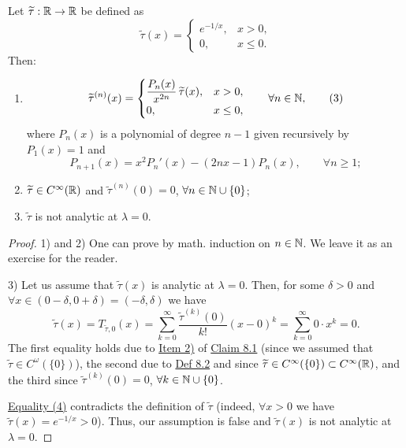 \begin{claim}\label{claim:8.2}
Let $\widetilde\tau:\mathbb{R}\to\mathbb{R}$ be defined as
\[
\widetilde\tau(x)=
\begin{cases}
e^{-1/x},&x>0,\\
0,&x\leq0.
\end{cases}
\]
Then:
\begin{enumerate}
    \item\label{item:claim:8.2:1}
    \[
    \widetilde\tau^{(n)}(x)=
    \begin{cases}
    \dfrac{P_n(x)}{x^{2n}}\,\widetilde\tau(x),&x>0,\\
    0,&x\leq0,
    \end{cases}
    \qquad \forall n\in\mathbb{N},
    \tag{3}\label{eq:8:3:1}
    \]
    where $P_n(x)$ is a polynomial of degree $n-1$ given recursively by $P_1(x)=1$ and
    \[
    P_{n+1}(x)=x^2P_n'(x)-(2nx-1)P_n(x),\qquad \forall n\geq1;
    \]
    \item\label{item:claim:8.2:2} $\widetilde\tau\in C^\infty(\mathbb{R})$ and $\widetilde\tau^{(n)}(0)=0$, $\forall n\in\mathbb{N}\cup\{0\}$;
    \item\label{item:claim:8.2:3} $\widetilde\tau$ is not analytic at $\lambda=0$.
\end{enumerate}
\end{claim}

\begin{proof}
1) and 2) One can prove by math. induction on $n\in\mathbb{N}$.
We leave it as an exercise for the reader.

3) Let us assume that $\widetilde\tau(x)$ is analytic at $\lambda=0$.
Then, for some $\delta>0$ and $\forall x\in(0-\delta,0+\delta)=(-\delta,\delta)$ we have
\[
\widetilde\tau(x)
=T_{\widetilde\tau,0}(x)
=\sum_{k=0}^{\infty}\frac{\widetilde\tau^{(k)}(0)}{k!}(x-0)^k
=\sum_{k=0}^{\infty}0\cdot x^k
=0.
\tag{4}\label{eq:8:4:1}
\]
The first equality holds due to \hyperref[item:claim:8.1:2]{Item 2)} of \hyperref[claim:8.1]{Claim 8.1} (since we assumed that $\widetilde\tau\in C^\omega(\{0\})$), the second due to \hyperref[def:8.2]{Def 8.2} and since $\widetilde\tau\in C^\infty(\{0\})\subset C^\infty(\mathbb{R})$, and the third since $\widetilde\tau^{(k)}(0)=0$, $\forall k\in\mathbb{N}\cup\{0\}$.

\hyperref[eq:8:4:1]{Equality (4)} contradicts the definition of $\widetilde\tau$ (indeed, $\forall x>0$ we have $\widetilde\tau(x)=e^{-1/x}>0$). Thus, our assumption is false and $\widetilde\tau(x)$ is not analytic at $\lambda=0$.
\end{proof}

